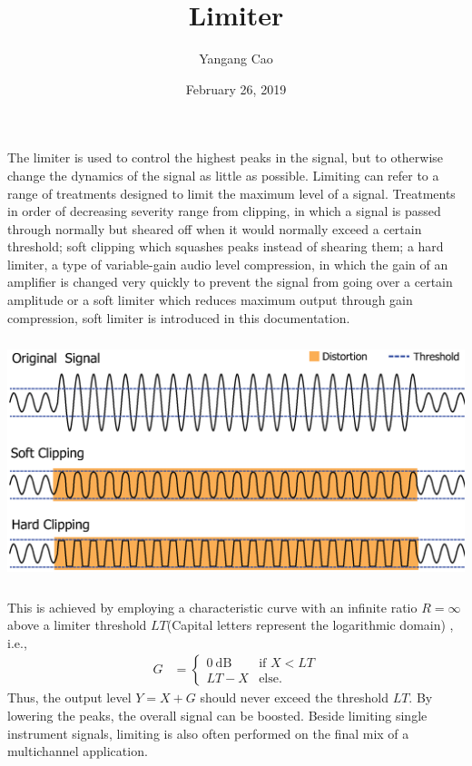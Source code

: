 \documentclass[10pt,a4paper,oneside]{article}
\author{Yangang Cao}
\date{February 26, 2019}
\begin{document}
\title{Limiter}
\maketitle 
The limiter is used to control the highest peaks in the signal, but to otherwise change the dynamics of the signal as little as possible. Limiting can refer to a range of treatments designed to limit the maximum level of a signal. Treatments in order of decreasing severity range from clipping, in which a signal is passed through normally but sheared off when it would normally exceed a certain threshold; soft clipping which squashes peaks instead of shearing them; a hard limiter, a type of variable-gain audio level compression, in which the gain of an amplifier is changed very quickly to prevent the signal from going over a certain amplitude or a soft limiter which reduces maximum output through gain compression, soft limiter is introduced in this documentation.
\begin{center}
\includegraphics[height=200pt]{Clipping_waveform.eps} 
\end{center}


This is achieved by employing a characteristic curve with an infinite ratio $R = \infty$ above a limiter threshold $LT$(Capital letters represent the logarithmic domain) , i.e.,
\begin{align*}
G &=
\begin{cases} 
0 \ \mbox{dB}  &\mbox{if }X < LT\\
LT-X &\mbox{else}.
\end{cases}
\end{align*}
Thus, the output level $Y = X + G$ should never exceed the threshold $LT$. By lowering the peaks, the overall signal can be boosted. Beside limiting single instrument signals, limiting is also often performed on the final mix of a multichannel application.
\end{document}
